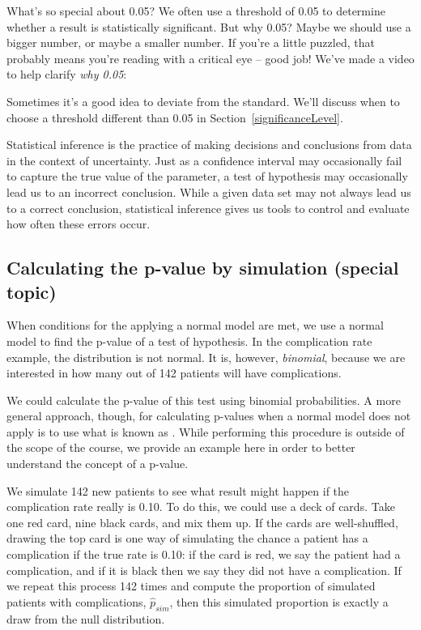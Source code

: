 \begin{onebox}{What's so special about 0.05?}
We often use a threshold of 0.05 to determine whether a result is statistically significant. But why 0.05? Maybe we should use a bigger number, or maybe a smaller number. If you're a little puzzled, that probably means you're reading with a critical eye -- good job! We've made a video to help clarify \emph{why 0.05}:
\begin{center}
\end{center}
Sometimes it's a good idea to deviate from the standard. We'll discuss when to choose a threshold different than 0.05 in Section~\ref{significanceLevel}.\vspace{0.5mm}\end{onebox}

Statistical inference is the practice of making decisions and conclusions from data in the context of uncertainty. Just as a confidence interval may occasionally fail to capture the true value of the parameter, a test of hypothesis may occasionally lead us to an incorrect conclusion. While a given data set may not always lead us to a correct conclusion, statistical inference gives us tools to control and evaluate how often these errors occur.


\D{\newpage}

\subsection{Calculating the p-value by simulation (special topic)}
\label{calcPValueUsingSimulationSubSection}

When conditions for the applying a normal model are met, we use a normal model to find the p-value of a test of hypothesis. In the complication rate example, the distribution is not normal. It is, however, \emph{binomial}, because we are interested in how many out of 142 patients will have complications.

We could calculate the p-value of this test using binomial probabilities. A more general approach, though, for calculating p-values when a normal model does not apply is to use what is known as . While performing this procedure is outside of the scope of the course, we provide an example here in order to better understand the concept of a p-value.

We simulate 142 new patients to see what result might happen if the complication rate really is 0.10. To do this, we could use a deck of cards. Take one red card, nine black cards, and mix them up. If the cards are well-shuffled, drawing the top card is one way of simulating the chance a patient has a complication if the true rate is 0.10: if the card is red, we say the patient had a complication, and if it is black then we say they did not have a complication. If we repeat this process 142 times and compute the proportion of simulated patients with complications, $\hat{p}_{sim}$, then this simulated proportion is exactly a draw from the null distribution.

